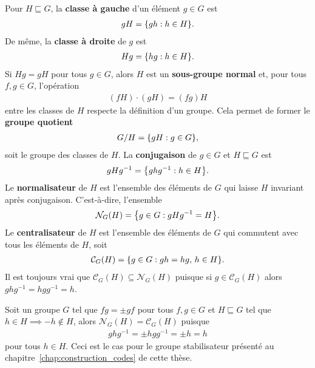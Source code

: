 Pour $H \sqsubseteq G$,
la \textbf{classe à gauche} d'un élément $g \in G$ est
\begin{align}
  gH = \qty{gh : h \in H}.
\end{align}
De même,
la \textbf{classe à droite} de $g$ est 
\begin{align}
  Hg = \qty{hg : h \in H}.
\end{align}
Si $Hg = gH$ pour tous $g \in G$,
alors $H$ est un \textbf{sous-groupe normal} et,
pour tous $f, g \in G$, l'opération
\begin{align}
  (fH)\cdot(gH) = (fg)H
\end{align}
entre les classes de $H$ respecte la définition d'un groupe.
Cela permet de former le \textbf{groupe quotient} 
\begin{align}
  G / H = \qty{gH : g \in G},
\end{align}
soit le groupe des classes de $H$.
La \textbf{conjugaison} de $g \in G$ et $H \sqsubseteq G$ est 
\begin{align}
  gHg^{-1} = \qty{ghg^{-1} : h \in H}.
\end{align}
Le \textbf{normalisateur} de $H$ est l'ensemble des éléments de $G$ qui laisse $H$
invariant après conjugaison.
C'est-à-dire, l'ensemble
\begin{align}
  \mathcal{N}_G(H) = \qty{g \in G : gHg^{-1} = H}.
\end{align}
Le \textbf{centralisateur} de $H$ est l'ensemble des éléments de $G$ qui commutent avec
tous les éléments de $H$, soit
\begin{align}
  \mathcal{C}_G(H) = \qty{g \in G : gh = hg,\, h \in H}.
\end{align}
Il est toujours vrai que $\mathcal{C}_G(H) \subseteq \mathcal{N}_G(H)$ puisque
si $g \in \mathcal{C}_G(H)$ alors $ghg^{-1} = hgg^{-1} = h$.

Soit un groupe $G$ tel que $fg = \pm gf$ pour tous $f,g \in G$
et $H \sqsubseteq G$ tel que $h \in H \implies -h \not\in H$,
alors $\mathcal{N}_G(H) = \mathcal{C}_G(H)$ puisque
\begin{align}
  ghg^{-1} = \pm hgg^{-1} = \pm h = h
\end{align}
pour tous $h \in H$.
Ceci est le cas pour le groupe stabilisateur présenté au chapitre~\ref{chap:construction_codes}
de cette thèse.
